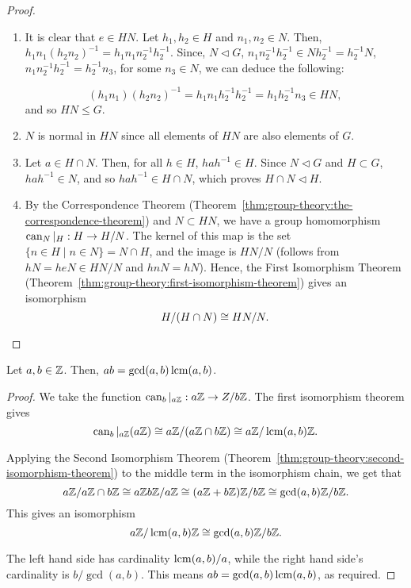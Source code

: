 \begin{proof}
  \begin{enumerate}
  \item
    It is clear that \(e \in HN\).
    Let \(h_{1}, h_{2} \in H\) and \(n_{1}, n_{2} \in N\).
    Then, \(h_{1}n_{1}(h_{2}n_{2})^{-1} = h_{1}n_{1}n_{2}^{-1}h_{2}^{-1}\).
    Since, \(N \triangleleft G\), \(n_{1}n_{2}^{-1}h_{2}^{-1} \in Nh_{2}^{-1} = h_{2}^{-1}N\), \(n_{1}n_{2}^{-1}h_{2}^{-1} = h_{2}^{-1}n_{3}\), for some \(n_{3} \in N\), we can deduce the following:

    \[(h_{1}n_{1})(h_{2}n_{2})^{-1} = h_{1}n_{1}h_{2}^{-1}h_{2}^{-1} = h_{1}h_{2}^{-1}n_{3} \in HN,\]
    and so \(HN \leq G\).

    \item
      \(N\) is normal in \(HN\) since all elements of \(HN\) are also elements of \(G\).

    \item
      Let \(a \in H \cap N\).
      Then, for all \(h \in H\), \(hah^{-1} \in H\).
      Since \(N \triangleleft G\) and \(H \subset G\), \(hah^{-1} \in N\), and so \(hah^{-1} \in H \cap N\), which proves \(H\cap N \triangleleft H\).
    \item
     By the Correspondence Theorem (Theorem~\ref{thm:group-theory:the-correspondence-theorem}) and \(N \subset HN\), we have a group homomorphism \(\operatorname{can}_{N}|_{H}: H \to H/N\).
     The kernel of this map is the set \(\{n \in H \mid n \in N\} = N \cap H\), and the image is \(HN/N\) (follows from \(hN = heN \in HN/N\) and \(hnN = hN\)).
     Hence, the First Isomorphism Theorem (Theorem~\ref{thm:group-theory:first-isomorphism-theorem}) gives an isomorphism
     \[H/(H\cap N) \cong HN/N.\]
  \end{enumerate}
\end{proof}

\begin{corollary}
  Let \(a,b \in \mathbb{Z}\).
  Then, \(ab = \gcd(a,b)\operatorname{lcm}(a,b)\).
\end{corollary}

\begin{proof}
  We take the function \(\operatorname{can}_{b}|_{a\mathbb{Z}} : a\mathbb{Z} \to Z / b\mathbb{Z}\).
  The first isomorphism theorem gives
  \[\operatorname{can}_{b}|_{a\mathbb{Z}}(a\mathbb{Z}) \cong a\mathbb{Z} / (a\mathbb{Z} \cap b\mathbb{Z}) \cong a\mathbb{Z} / \operatorname{lcm}(a,b)\mathbb{Z}.\]

  Applying the Second Isomorphism Theorem (Theorem~\ref{thm:group-theory:second-isomorphism-theorem}) to the middle term in the isomorphism chain, we get that
  \[a\mathbb{Z} / a\mathbb{Z} \cap b\mathbb{Z} \cong a\mathbb{Z} b\mathbb{Z} / a\mathbb{Z} \cong (a\mathbb{Z} + b\mathbb{Z})\mathbb{Z} / b\mathbb{Z} \cong \gcd(a,b) \mathbb{Z} / b\mathbb{Z}.\]
  This gives an isomorphism
  \[a\mathbb{Z}/ \operatorname{lcm}(a,b)\mathbb{Z} \cong \gcd(a,b)\mathbb{Z}/ b\mathbb{Z}.\]

  The left hand side has cardinality \(\operatorname{lcm}(a,b)/a\), while the right hand side's cardinality is \(b/\gcd(a,b)\).
  This means \(ab = \gcd(a,b)\operatorname{lcm}(a,b)\), as required.
\end{proof}





